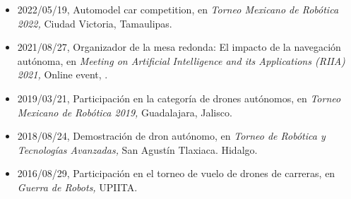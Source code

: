 \begin{itemize} 
\item 2022/05/19, Automodel car competition, en \textit{ Torneo Mexicano de Robótica 2022,} Ciudad Victoria, Tamaulipas.
\item 2021/08/27, Organizador de la mesa redonda: El impacto de la navegación autónoma, en \textit{ Meeting on Artificial Intelligence and its Applications (RIIA) 2021,} Online event, \href{https://www.dropbox.com/s/i73p5valw0ei3kb/2021_RIIA.pdf?dl=0}{\faFilePdfO}.
\item 2019/03/21, Participación en la categoría de drones autónomos, en \textit{ Torneo Mexicano de Robótica 2019,} Guadalajara, Jalisco.
\item 2018/08/24, Demostración de dron autónomo, en \textit{ Torneo de Robótica y Tecnologías Avanzadas,} San Agustín Tlaxiaca. Hidalgo.
\item 2016/08/29, Participación en el torneo de vuelo de drones de carreras, en \textit{ Guerra de Robots,} UPIITA.
\end{itemize} 

